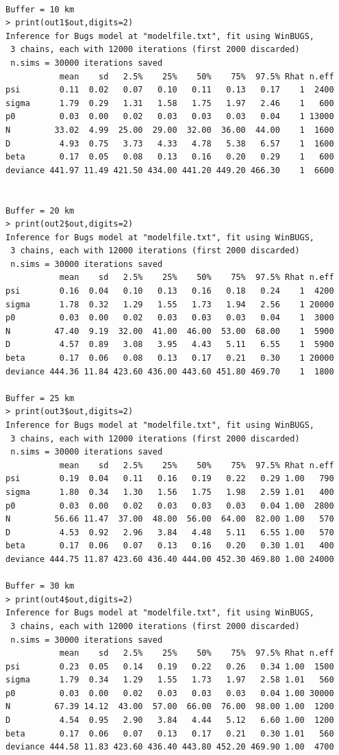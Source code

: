 \begin{verbatim}

Buffer = 10 km
> print(out1$out,digits=2)
Inference for Bugs model at "modelfile.txt", fit using WinBUGS,
 3 chains, each with 12000 iterations (first 2000 discarded)
 n.sims = 30000 iterations saved
           mean    sd   2.5%    25%    50%    75%  97.5% Rhat n.eff
psi        0.11  0.02   0.07   0.10   0.11   0.13   0.17    1  2400
sigma      1.79  0.29   1.31   1.58   1.75   1.97   2.46    1   600
p0         0.03  0.00   0.02   0.03   0.03   0.03   0.04    1 13000
N         33.02  4.99  25.00  29.00  32.00  36.00  44.00    1  1600
D          4.93  0.75   3.73   4.33   4.78   5.38   6.57    1  1600
beta       0.17  0.05   0.08   0.13   0.16   0.20   0.29    1   600
deviance 441.97 11.49 421.50 434.00 441.20 449.20 466.30    1  6600


Buffer = 20 km
> print(out2$out,digits=2)
Inference for Bugs model at "modelfile.txt", fit using WinBUGS,
 3 chains, each with 12000 iterations (first 2000 discarded)
 n.sims = 30000 iterations saved
           mean    sd   2.5%    25%    50%    75%  97.5% Rhat n.eff
psi        0.16  0.04   0.10   0.13   0.16   0.18   0.24    1  4200
sigma      1.78  0.32   1.29   1.55   1.73   1.94   2.56    1 20000
p0         0.03  0.00   0.02   0.03   0.03   0.03   0.04    1  3000
N         47.40  9.19  32.00  41.00  46.00  53.00  68.00    1  5900
D          4.57  0.89   3.08   3.95   4.43   5.11   6.55    1  5900
beta       0.17  0.06   0.08   0.13   0.17   0.21   0.30    1 20000
deviance 444.36 11.84 423.60 436.00 443.60 451.80 469.70    1  1800

Buffer = 25 km
> print(out3$out,digits=2)
Inference for Bugs model at "modelfile.txt", fit using WinBUGS,
 3 chains, each with 12000 iterations (first 2000 discarded)
 n.sims = 30000 iterations saved
           mean    sd   2.5%    25%    50%    75%  97.5% Rhat n.eff
psi        0.19  0.04   0.11   0.16   0.19   0.22   0.29 1.00   790
sigma      1.80  0.34   1.30   1.56   1.75   1.98   2.59 1.01   400
p0         0.03  0.00   0.02   0.03   0.03   0.03   0.04 1.00  2800
N         56.66 11.47  37.00  48.00  56.00  64.00  82.00 1.00   570
D          4.53  0.92   2.96   3.84   4.48   5.11   6.55 1.00   570
beta       0.17  0.06   0.07   0.13   0.16   0.20   0.30 1.01   400
deviance 444.75 11.87 423.60 436.40 444.00 452.30 469.80 1.00 24000

Buffer = 30 km
> print(out4$out,digits=2)
Inference for Bugs model at "modelfile.txt", fit using WinBUGS,
 3 chains, each with 12000 iterations (first 2000 discarded)
 n.sims = 30000 iterations saved
           mean    sd   2.5%    25%    50%    75%  97.5% Rhat n.eff
psi        0.23  0.05   0.14   0.19   0.22   0.26   0.34 1.00  1500
sigma      1.79  0.34   1.29   1.55   1.73   1.97   2.58 1.01   560
p0         0.03  0.00   0.02   0.03   0.03   0.03   0.04 1.00 30000
N         67.39 14.12  43.00  57.00  66.00  76.00  98.00 1.00  1200
D          4.54  0.95   2.90   3.84   4.44   5.12   6.60 1.00  1200
beta       0.17  0.06   0.07   0.13   0.17   0.21   0.30 1.01   560
deviance 444.58 11.83 423.60 436.40 443.80 452.20 469.90 1.00  4700


\end{verbatim}
